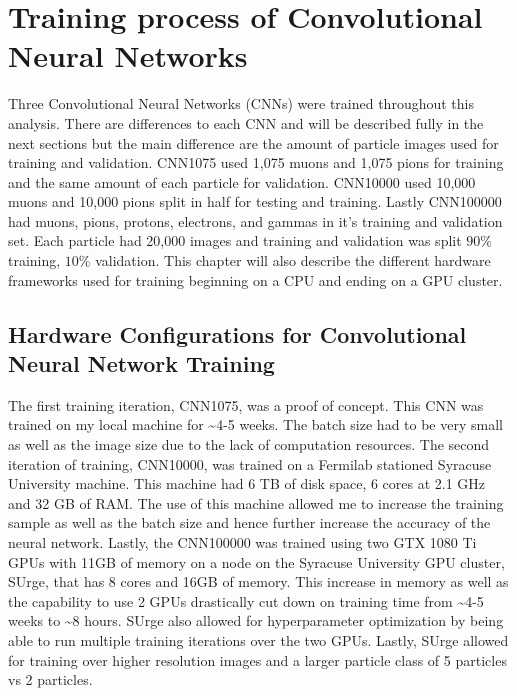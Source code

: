 \chapter{Training process of Convolutional Neural Networks}\label{ch:cnn_train}
Three Convolutional Neural Networks (CNNs) were trained throughout this analysis. There are differences to each CNN and will be described fully in the next sections but the main difference are the amount of particle images used for training and validation. CNN1075 used 1,075 muons and 1,075 pions for training and the same amount of each particle for validation. CNN10000 used 10,000 muons and 10,000 pions split in half for testing and training. Lastly CNN100000 had muons, pions, protons, electrons, and gammas in it's training and validation set. Each particle had 20,000 images and training and validation was split $90\%$ training, $10\%$ validation. This chapter will also describe the different hardware frameworks used for training beginning on a CPU and ending on a GPU cluster. 




\section{Hardware Configurations for Convolutional Neural Network Training}\label{research approach}
The first training iteration, CNN1075, was a proof of concept. This CNN was trained on my local machine for \sim 4-5 weeks. The batch size had to be very small as well as the image size due to the lack of computation resources. The second iteration of training, CNN10000, was trained on a Fermilab stationed Syracuse University machine. This machine had 6 TB of disk space, 6 cores at 2.1 GHz and 32 GB of RAM. The use of this machine allowed me to increase the training sample as well as the batch size and hence further increase the accuracy of the neural network. Lastly, the CNN100000 was trained using two GTX 1080 Ti GPUs with 11GB of memory on a node on the Syracuse University GPU cluster, SUrge, that has 8 cores and 16GB of memory. This increase in memory as well as the capability to use 2 GPUs drastically cut down on training time from \sim 4-5 weeks to \sim 8 hours. SUrge also allowed for hyperparameter optimization by being able to run multiple training iterations over the two GPUs. Lastly, SUrge allowed for training over higher resolution images and a larger particle class of 5 particles vs 2 particles. 

